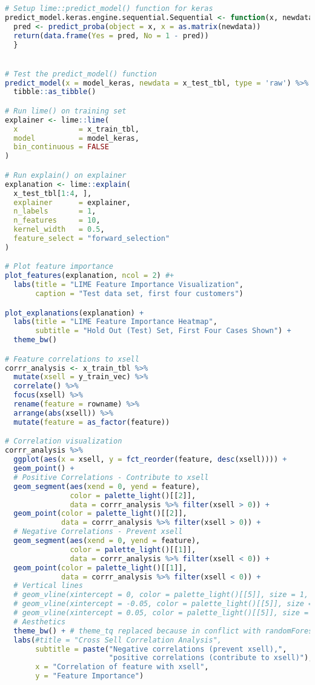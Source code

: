 \begin{lstlisting}[language=R,caption={Main analysis}, label=lst_main]
# Setup lime::predict_model() function for keras
predict_model.keras.engine.sequential.Sequential <- function(x, newdata, type, ...) {
  pred <- predict_proba(object = x, x = as.matrix(newdata))
  return(data.frame(Yes = pred, No = 1 - pred))
  }


# Test the predict_model() function
predict_model(x = model_keras, newdata = x_test_tbl, type = 'raw') %>%
  tibble::as_tibble()

# Run lime() on training set
explainer <- lime::lime(
  x              = x_train_tbl, 
  model          = model_keras, 
  bin_continuous = FALSE
)

# Run explain() on explainer
explanation <- lime::explain(
  x_test_tbl[1:4, ], 
  explainer      = explainer, 
  n_labels       = 1, 
  n_features     = 10,
  kernel_width   = 0.5,
  feature_select = "forward_selection"
)

# Plot feature importance
plot_features(explanation, ncol = 2) #+
  labs(title = "LIME Feature Importance Visualization",
       caption = "Test data set, first four customers")

plot_explanations(explanation) +
  labs(title = "LIME Feature Importance Heatmap",
       subtitle = "Hold Out (Test) Set, First Four Cases Shown") +
  theme_bw()

# Feature correlations to xsell
corrr_analysis <- x_train_tbl %>%
  mutate(xsell = y_train_vec) %>%
  correlate() %>%
  focus(xsell) %>%
  rename(feature = rowname) %>%
  arrange(abs(xsell)) %>%
  mutate(feature = as_factor(feature)) 

# Correlation visualization
corrr_analysis %>%
  ggplot(aes(x = xsell, y = fct_reorder(feature, desc(xsell)))) +
  geom_point() +
  # Positive Correlations - Contribute to xsell
  geom_segment(aes(xend = 0, yend = feature), 
               color = palette_light()[[2]], 
               data = corrr_analysis %>% filter(xsell > 0)) +
  geom_point(color = palette_light()[[2]], 
             data = corrr_analysis %>% filter(xsell > 0)) +
  # Negative Correlations - Prevent xsell
  geom_segment(aes(xend = 0, yend = feature), 
               color = palette_light()[[1]], 
               data = corrr_analysis %>% filter(xsell < 0)) +
  geom_point(color = palette_light()[[1]], 
             data = corrr_analysis %>% filter(xsell < 0)) +
  # Vertical lines
  # geom_vline(xintercept = 0, color = palette_light()[[5]], size = 1, linetype = 2) +
  # geom_vline(xintercept = -0.05, color = palette_light()[[5]], size = 1, linetype = 2) +
  # geom_vline(xintercept = 0.05, color = palette_light()[[5]], size = 1, linetype = 2) +
  # Aesthetics
  theme_bw() + # theme_tq replaced because in conflict with randomForest package
  labs(#title = "Cross Sell Correlation Analysis",
       subtitle = paste("Negative correlations (prevent xsell),",
                        "positive correlations (contribute to xsell)"),
       x = "Correlation of feature with xsell",
       y = "Feature Importance")


\end{lstlisting}
